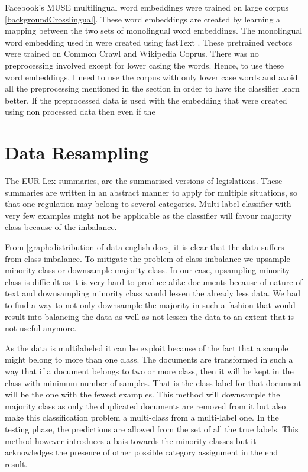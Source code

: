 Facebook's MUSE multilingual word embeddings \cite{conneau2017word} were trained on large corpus \ref{backgroundCrosslingual}. These word embeddings are created by learning a mapping between the two sets of monolingual word embeddings. The monolingual word embedding used in were created using fastText \cite{bojanowski2017enriching}. These pretrained vectors were trained on Common Crawl and Wikipedia Coprus. There was no preprocessing involved except for lower casing the words. Hence, to use these word embeddings, I need to use the corpus with only lower case words and avoid all the preprocessing mentioned in the section in order to have the classifier learn better. If the preprocessed data is used with the embedding that were created using non processed data then even if the 

\fi
\section{Data Resampling} \label{dataResampling}
The EUR-Lex summaries, are the summarised versions of legislations. These summaries are written in an abstract manner to apply for multiple situations, so that one regulation may belong to several categories. Multi-label classifier with very few examples might not be applicable as the classifier will favour majority class because of the imbalance. 

From \ref{graph:distribution of data english docs} it is clear that the data suffers from class imbalance. To mitigate the problem of class imbalance we upsample minority class or downsample majority class. In our case, upsampling minority class is difficult as it is very hard to produce alike documents because of nature of text and downsampling minority class would lessen the already less data. We had to find a way to not only downsample the majority in such a fashion that would result into balancing the data as well as not lessen the data to an extent that is not useful anymore.

As the data is multilabeled it can be exploit because of the fact that a sample might belong to more than one class. The documents are transformed in such a way that if a document belongs to two or more class, then it will be kept in the class with minimum number of samples. That is the class label for that document will be the one with the fewest examples. This method will downsample the majority class as only the duplicated documents are removed from it but also make this classification problem a multi-class from a multi-label one. In the testing phase, the predictions are allowed from the set of all the true labels. This method however introduces a bais towards the minority classes but it acknowledges the presence of other possible category assignment in the end result.

